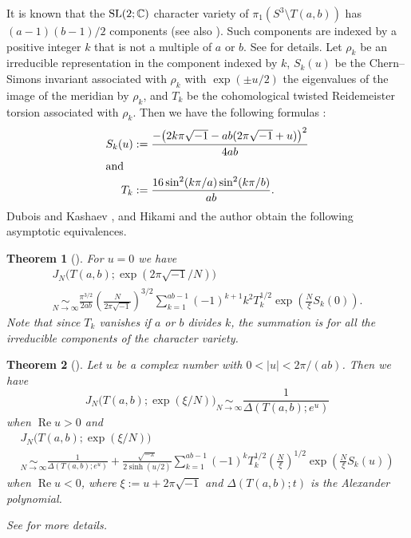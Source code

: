 \documentclass[a4paper]{amsart}
\theoremstyle{plain}
\newtheorem{thm}{Theorem}[section]
\theoremstyle{definition}
\theoremstyle{remark}
\newcommand{\C}{\mathbb{C}}
\newcommand{\SL}{\rm{SL}}
\renewcommand{\Re}{\operatorname{Re}}
\numberwithin{equation}{section}
\begin{document}
It is known that the $\SL(2;\C)$ character variety of $\pi_1(S^3\setminus{T(a,b)})$ has $(a-1)(b-1)/2$ components \cite{Klassen:TRAAM1991} (see also \cite{Munoz:REVMC2009}).
Such components are indexed by a positive integer $k$ that is not a multiple of $a$ or $b$.
See \cite[\S~2]{Hikami/Murakami:Bonn} for details.
Let $\rho_k$ be an irreducible representation in the component indexed by $k$, 
$S_k(u)$ be the Chern--Simons invariant associated with $\rho_k$ with $\exp(\pm u/2)$ the eigenvalues of the image of the meridian by $\rho_k$, and $T_k$ be the cohomological twisted Reidemeister torsion associated with $\rho_k$.
Then we have the following formulas \cite{Hikami/Murakami:Bonn}:
\begin{align*}
  S_k(u)
  &:=
  \frac{-\bigl(2k\pi\sqrt{-1}-ab(2\pi\sqrt{-1}+u)\bigr)^2}{4ab}
  \\
  \intertext{and}
  T_k
  &:=
  \frac{16\sin^2(k\pi/a)\sin^2(k\pi/b)}{ab}.
\end{align*}
Dubois and Kashaev \cite{Dubois/Kashaev:MATHA2007}, and Hikami and the author \cite{Hikami/Murakami:Bonn} obtain the following asymptotic equivalences.
\begin{thm}[\cite{Dubois/Kashaev:MATHA2007}]
For $u=0$ we have
\begin{multline*}
  J_N\bigl(T(a,b);\exp(2\pi\sqrt{-1}/N)\bigr)
  \\
  \underset{N\to\infty}{\sim}
  \frac{\pi^{3/2}}{2ab}
  \left(\frac{N}{2\pi\sqrt{-1}}\right)^{3/2}
  \sum_{k=1}^{ab-1}
  (-1)^{k+1}k^2
  T_k^{1/2}
  \exp\left(\frac{N}{\xi}S_k(0)\right).
\end{multline*}
Note that since $T_k$ vanishes if $a$ or $b$ divides $k$, the summation is for all the irreducible components of the character variety.
\end{thm}
\begin{thm}[\cite{Hikami/Murakami:Bonn}]
Let $u$ be a complex number with $0<|u|<2\pi/(ab)$.
Then we have
\begin{equation*}
  J_N\bigl(T(a,b);\exp(\xi/N)\bigr)
  \underset{N\to\infty}{\sim}
  \frac{1}{\Delta(T(a,b);e^{u})}
\end{equation*}
when $\Re{u}>0$ and
\begin{multline*}
  J_N\bigl(T(a,b);\exp(\xi/N)\bigr)
  \\
  \underset{N\to\infty}{\sim}
  \frac{1}{\Delta(T(a,b);e^u)}
  +
  \frac{
  \sqrt{-\pi}}{2\sinh(u/2)}
  \sum_{k=1}^{ab-1}
  (-1)^{k}
  T_k^{1/2}
  \left(\frac{N}{\xi}\right)^{1/2}
  \exp\left(\frac{N}{\xi}S_k(u)\right)
\end{multline*}
when $\Re{u}<0$, where $\xi:=u+2\pi\sqrt{-1}$ and $\Delta(T(a,b);t)$ is the Alexander polynomial.
\par
See \cite{Hikami/Murakami:Bonn} for more details.
\end{thm}
\end{document}
